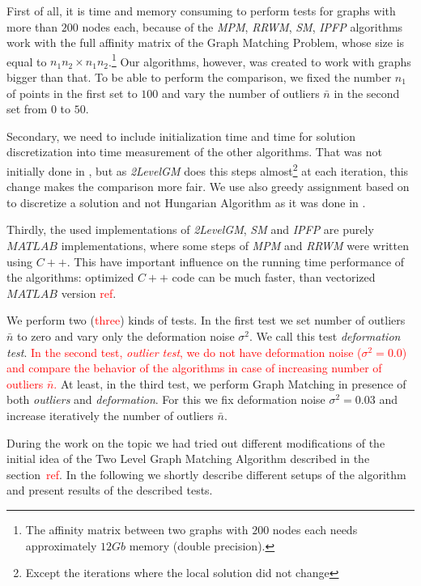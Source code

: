 \documentclass[
	fontsize=12pt,
	paper=a4,
	twoside=false,
	numbers=noenddot,
	plainheadsepline,
	toc=listof,
	toc=bibliography
]{scrartcl}
\newcommand\ToDo[1]{\textcolor{red}{#1}}
\begin{document}
First of all, it is time and memory consuming to perform tests for graphs with more than $200$ nodes each, because of the \emph{MPM}, \emph{RRWM}, \emph{SM}, \emph{IPFP} algorithms work with the full affinity matrix of the Graph Matching Problem, whose size is equal to $n_1n_2\times n_1n_2$.\footnote{The affinity matrix between two graphs with $200$ nodes each needs approximately $12Gb$ memory (double precision).} Our algorithms, however, was created to work with graphs bigger than that. To be able to perform the comparison, we fixed the number $n_1$ of points in the first set to $100$ and vary the number of outliers $\bar{n}$ in the second set from $0$ to $50$.

Secondary, we need to include initialization time and time for solution discretization into time measurement of the other algorithms. That was not initially done in \cite{Cho2014_Haystack}, but as \emph{2LevelGM} does this steps almost\footnote{Except the iterations where the local solution did not change} at each iteration, this change makes the comparison more fair. We use also greedy assignment based on \cite{Leordeanu2005} to discretize a solution and not Hungarian Algorithm as it was done in \cite{Cho2014_Haystack}.

Thirdly, the used implementations of \emph{2LevelGM}, \emph{SM} and \emph{IPFP} are purely $MATLAB$ implementations, where some steps of \emph{MPM} and \emph{RRWM} were written using $C++$. This have important influence on the running time performance of the algorithms: optimized $C++$ code can be much faster, than vectorized $MATLAB$ version \ToDo{ref}.

We perform two (\ToDo{three}) kinds of tests. In the first test we set number of outliers $\bar{n}$ to zero and vary only the deformation noise $\sigma^2$. We call this test \emph{deformation test}. \ToDo{In the second test, \emph{outlier test}, we do not have deformation noise ($\sigma^2= 0.0$) and compare the behavior of the algorithms in case of increasing number of outliers $\bar{n}$.} At least, in the third test, we perform Graph Matching in presence of both \emph{outliers} and \emph{deformation}. For this we fix deformation noise $\sigma^2= 0.03$ and increase iteratively the number of outliers $\bar{n}$. 

During the work on the topic we had tried out different modifications of the initial idea of the Two Level Graph Matching Algorithm described in the section~\ToDo{ref}. In the following we shortly describe different setups of the algorithm and present results of the described tests.
\end{document}
